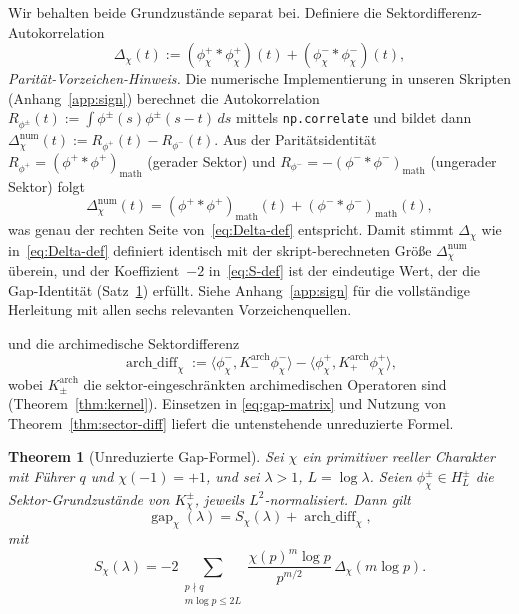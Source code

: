 \documentclass[10pt,twocolumn]{article}
\newtheorem{theorem}{Theorem}[section]
\theoremstyle{definition}
\theoremstyle{remark}
\newcommand{\gap}{\operatorname{gap}}
\newcommand{\chifn}{\chi}
\newcommand{\Deltachi}{\Delta_{\chifn}}
\newcommand{\archdiff}{\operatorname{arch\_diff}}
\begin{document}
Wir behalten beide Grundzustände separat bei. Definiere die Sektordifferenz-Autokorrelation
\begin{equation}
\label{eq:Delta-def}
  \Deltachi(t)
    := (\phi^+_{\chifn}\!*\phi^+_{\chifn})(t)
      + (\phi^-_{\chifn}\!*\phi^-_{\chifn})(t),
\end{equation}
\emph{Parität-Vorzeichen-Hinweis.} Die numerische Implementierung in unseren Skripten
(Anhang~\ref{app:sign}) berechnet die Autokorrelation
$R_{\phi^\pm}(t):=\int\phi^\pm(s)\phi^\pm(s-t)\,ds$ mittels
\texttt{np.correlate} und bildet dann
$\Deltachi^{\mathrm{num}}(t):=R_{\phi^+}(t)-R_{\phi^-}(t)$.
Aus der Paritätsidentität $R_{\phi^+}=(\phi^+{*}\phi^+)_{\mathrm{math}}$
(gerader Sektor) und $R_{\phi^-}=-(\phi^-{*}\phi^-)_{\mathrm{math}}$
(ungerader Sektor) folgt
\[
  \Deltachi^{\mathrm{num}}(t)
    =(\phi^+{*}\phi^+)_{\mathrm{math}}(t)+(\phi^-{*}\phi^-)_{\mathrm{math}}(t),
\]
was genau der rechten Seite von~\eqref{eq:Delta-def} entspricht. Damit stimmt
$\Deltachi$ wie in~\eqref{eq:Delta-def} definiert identisch mit der
skript-berechneten Größe $\Deltachi^{\mathrm{num}}$ überein, und der
Koeffizient~$-2$ in~\eqref{eq:S-def} ist der eindeutige Wert, der
die Gap-Identität (Satz~\ref{thm:closure}) erfüllt. Siehe
Anhang~\ref{app:sign} für die vollständige Herleitung mit allen sechs
relevanten Vorzeichenquellen.

und die archimedische Sektordifferenz
\begin{equation}
\label{eq:arch-diff-def}
  \archdiff_{\chifn}
    := \langle\phi^-_{\chifn},K^{\mathrm{arch}}_-\phi^-_{\chifn}\rangle
     - \langle\phi^+_{\chifn},K^{\mathrm{arch}}_+\phi^+_{\chifn}\rangle,
\end{equation}
wobei $K^{\mathrm{arch}}_\pm$ die sektor-eingeschränkten archimedischen
Operatoren sind (Theorem~\ref{thm:kernel}). Einsetzen in
\eqref{eq:gap-matrix} und Nutzung von Theorem~\ref{thm:sector-diff} liefert
die untenstehende unreduzierte Formel.

\begin{theorem}[Unreduzierte Gap-Formel]
\label{thm:closure}
Sei $\chifn$ ein primitiver reeller Charakter mit Führer $q$ und
$\chifn(-1)=+1$, und sei $\lambda>1$, $L=\log\lambda$. Seien
$\phi^\pm_{\chifn}\in H_L^\pm$ die Sektor-Grundzustände von
$K_{\chifn}^\pm$, jeweils $L^2$-normalisiert. Dann gilt
\begin{equation}
\label{eq:gap-unreduced}
  \gap_{\chifn}(\lambda)
    = S_{\chifn}(\lambda) + \archdiff_{\chifn},
\end{equation}
mit
\begin{equation}
\label{eq:S-def}
  S_{\chifn}(\lambda)
    = -2\sum_{\substack{p\nmid q\\m\log p\leq 2L}}
      \frac{\chifn(p)^m\log p}{p^{m/2}}\,\Deltachi(m\log p).
\end{equation}
\end{theorem}
\end{document}
